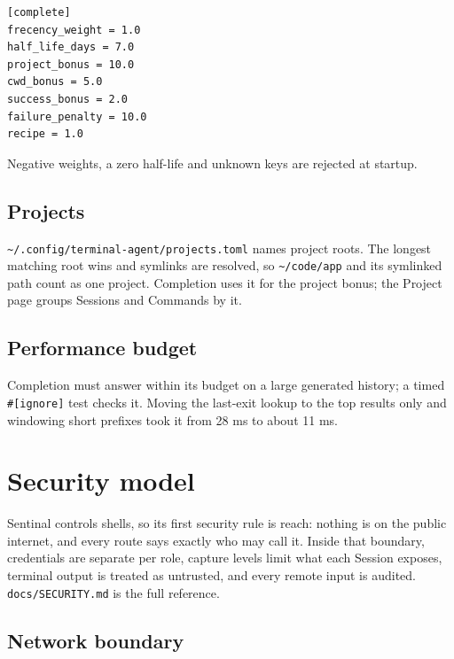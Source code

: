 \begin{lstlisting}
[complete]
frecency_weight = 1.0
half_life_days = 7.0
project_bonus = 10.0
cwd_bonus = 5.0
success_bonus = 2.0
failure_penalty = 10.0
recipe = 1.0
\end{lstlisting}

Negative weights, a zero half-life and unknown keys are rejected at startup.

\section{\texorpdfstring{Projects}{Projects}}

\texttt{\textasciitilde{}/\allowbreak{}.\allowbreak{}config/\allowbreak{}terminal-{}\allowbreak{}agent/\allowbreak{}projects.\allowbreak{}toml} names project roots. The longest matching root wins and symlinks are resolved, so \texttt{\textasciitilde{}/\allowbreak{}code/\allowbreak{}app} and its symlinked path count as one project. Completion uses it for the project bonus; the Project page groups Sessions and Commands by it.

\section{\texorpdfstring{Performance budget}{Performance budget}}

Completion must answer within its budget on a large generated history; a timed \texttt{\#[ignore]} test checks it. Moving the last-exit lookup to the top results only and windowing short prefixes took it from 28 ms to about 11 ms.

\chapter{\texorpdfstring{Security model}{Security model}}

Sentinal controls shells, so its first security rule is reach: nothing is on the public internet, and every route says exactly who may call it. Inside that boundary, credentials are separate per role, capture levels limit what each Session exposes, terminal output is treated as untrusted, and every remote input is audited. \texttt{docs/\allowbreak{}SECURITY.\allowbreak{}md} is the full reference.

\section{\texorpdfstring{Network boundary}{Network boundary}}

